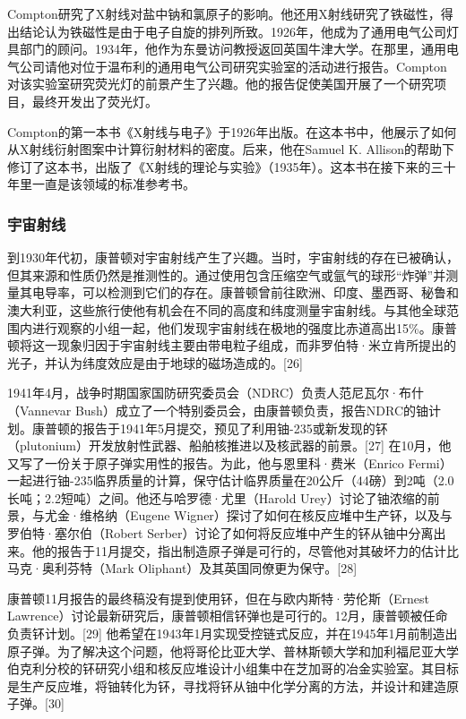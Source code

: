 Compton研究了X射线对盐中钠和氯原子的影响。他还用X射线研究了铁磁性，得出结论认为铁磁性是由于电子自旋的排列所致。1926年，他成为了通用电气公司灯具部门的顾问。1934年，他作为东曼访问教授返回英国牛津大学。在那里，通用电气公司请他对位于温布利的通用电气公司研究实验室的活动进行报告。Compton对该实验室研究荧光灯的前景产生了兴趣。他的报告促使美国开展了一个研究项目，最终开发出了荧光灯。

Compton的第一本书《X射线与电子》于1926年出版。在这本书中，他展示了如何从X射线衍射图案中计算衍射材料的密度。后来，他在Samuel K. Allison的帮助下修订了这本书，出版了《X射线的理论与实验》（1935年）。这本书在接下来的三十年里一直是该领域的标准参考书。
\subsubsection{宇宙射线}  
到1930年代初，康普顿对宇宙射线产生了兴趣。当时，宇宙射线的存在已被确认，但其来源和性质仍然是推测性的。通过使用包含压缩空气或氩气的球形“炸弹”并测量其电导率，可以检测到它们的存在。康普顿曾前往欧洲、印度、墨西哥、秘鲁和澳大利亚，这些旅行使他有机会在不同的高度和纬度测量宇宙射线。与其他全球范围内进行观察的小组一起，他们发现宇宙射线在极地的强度比赤道高出15\%。康普顿将这一现象归因于宇宙射线主要由带电粒子组成，而非罗伯特·米立肯所提出的光子，并认为纬度效应是由于地球的磁场造成的。[26]




1941年4月，战争时期国家国防研究委员会（NDRC）负责人范尼瓦尔·布什（Vannevar Bush）成立了一个特别委员会，由康普顿负责，报告NDRC的铀计划。康普顿的报告于1941年5月提交，预见了利用铀-235或新发现的钚（plutonium）开发放射性武器、船舶核推进以及核武器的前景。[27] 在10月，他又写了一份关于原子弹实用性的报告。为此，他与恩里科·费米（Enrico Fermi）一起进行铀-235临界质量的计算，保守估计临界质量在20公斤（44磅）到2吨（2.0长吨；2.2短吨）之间。他还与哈罗德·尤里（Harold Urey）讨论了铀浓缩的前景，与尤金·维格纳（Eugene Wigner）探讨了如何在核反应堆中生产钚，以及与罗伯特·塞尔伯（Robert Serber）讨论了如何将反应堆中产生的钚从铀中分离出来。他的报告于11月提交，指出制造原子弹是可行的，尽管他对其破坏力的估计比马克·奥利芬特（Mark Oliphant）及其英国同僚更为保守。[28]

康普顿11月报告的最终稿没有提到使用钚，但在与欧内斯特·劳伦斯（Ernest Lawrence）讨论最新研究后，康普顿相信钚弹也是可行的。12月，康普顿被任命负责钚计划。[29] 他希望在1943年1月实现受控链式反应，并在1945年1月前制造出原子弹。为了解决这个问题，他将哥伦比亚大学、普林斯顿大学和加利福尼亚大学伯克利分校的钚研究小组和核反应堆设计小组集中在芝加哥的冶金实验室。其目标是生产反应堆，将铀转化为钚，寻找将钚从铀中化学分离的方法，并设计和建造原子弹。[30]

